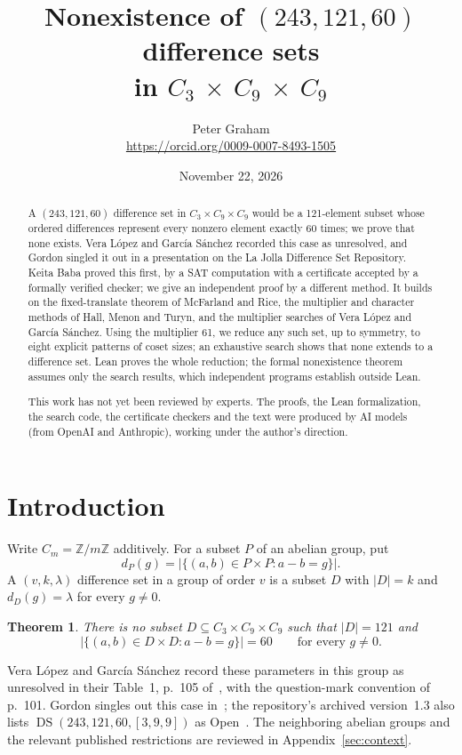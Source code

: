 \documentclass[11pt]{article}
\title{Nonexistence of $(243,121,60)$ difference sets\\ in $C_3$ $\times$ $C_9$ $\times$ $C_9$}
\author{Peter Graham\\ \small\url{https://orcid.org/0009-0007-8493-1505}}
\date{November 22, 2026}
\newtheorem{theorem}{Theorem}
\begin{document}
\maketitle

\begin{abstract}
A $(243,121,60)$ difference set in $C_3\times C_9\times C_9$ would be a
121-element subset whose ordered differences represent every nonzero
element exactly 60 times; we prove that none exists. Vera L\'opez and
Garc\'ia S\'anchez recorded this case as unresolved, and Gordon singled
it out in a presentation on the La Jolla Difference Set Repository.
Keita Baba proved this first, by a SAT computation with a certificate
accepted by a formally verified checker; we give an independent proof
by a different method. It builds on the fixed-translate theorem of
McFarland and Rice, the multiplier and character methods of Hall, Menon
and Turyn, and the multiplier searches of Vera L\'opez and Garc\'ia
S\'anchez. Using the multiplier 61, we reduce any such set, up to
symmetry, to eight explicit patterns of coset sizes; an exhaustive
search shows that none extends to a difference set. Lean proves the
whole reduction; the formal nonexistence theorem assumes only the
search results, which independent programs establish outside Lean.

This work has not yet been reviewed by experts. The proofs, the Lean formalization, the search code, the certificate checkers and the text were produced by AI models (from OpenAI and Anthropic), working under the author's direction.
\end{abstract}
\medskip

\section{Introduction}

Write $C_m=\mathbb Z/m\mathbb Z$ additively. For a subset $P$ of an
abelian group, put
\[
 d_P(g)=\bigl|\{(a,b)\in P\times P:a-b=g\}\bigr|.
\]
A $(v,k,\lambda)$ difference set in a group of order $v$ is a subset
$D$ with $|D|=k$ and $d_D(g)=\lambda$ for every $g\ne0$.

\begin{theorem}\label{thm:main}
There is no subset $D\subseteq C_3\times C_9\times C_9$ such that
$|D|=121$ and
\[
 \bigl|\{(a,b)\in D\times D:a-b=g\}\bigr|=60
 \qquad\text{for every }g\ne0.
\]
\end{theorem}

Vera L\'opez and Garc\'ia S\'anchez record these parameters in this
group as unresolved in their Table~1, p.~105 of~\cite{VeraGarcia1997}, with
the question-mark convention of p.~101. Gordon singles out this case
in~\cite[slide~38]{Gordon2019}; the repository's archived version~1.3
also lists $\operatorname{DS}(243,121,60,[3,9,9])$ as
Open~\cite{GordonData}. The neighboring abelian groups and the relevant
published restrictions are reviewed in Appendix~\ref{sec:context}.
\end{document}
